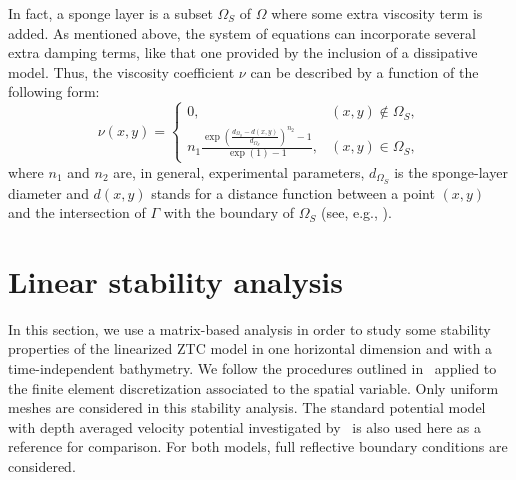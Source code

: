 In fact, a sponge layer is a subset $\Omega_S$ of $\Omega$ where some
extra viscosity term is added.  As mentioned above, the system of
equations can incorporate several extra damping terms, like that one
provided by the inclusion of a dissipative model. Thus, the viscosity
coefficient $\nu$ can be described by a function of the following
form:
\begin{equation}
\label{eq:lopes:sponge}
\nu(x,y)= \left\{
  \begin{matrix}
    0,& (x,y)\not\in\Omega_S ,\\ \displaystyle
    n_1\frac{\displaystyle\exp{\left(\frac{d_{\Omega_S}-d(x,y)}
          {d_{\Omega_S}}\right)^{n_2}}-1}{\exp(1)-1},& (x,y)
    \in\Omega_S,
  \end{matrix}
\right.
\end{equation}
where $n_1$ and $n_2$ are, in general, experimental parameters,
$d_{\Omega_S}$ is the sponge-layer diameter and $d(x,y)$ stands for a
distance function between a point $(x,y)$ and the intersection of
$\Gamma$ with the boundary of $\Omega_S$ (see,
e.g., \citet{Walkley1999}).

\section{Linear stability analysis}
\label{sec:lopes:linearanalysis}

In this section, we use a matrix-based analysis in order to study some
stability properties of the linearized ZTC model in one horizontal
dimension and with a time-independent bathymetry. We follow the
procedures outlined in~\citet{LovholtPedersen2009} applied to the
finite element discretization associated to the spatial variable.
Only uniform meshes are considered in this stability analysis.  The
standard potential model with depth averaged velocity potential
investigated by~\citet{LovholtPedersen2009} is also used here as a
reference for comparison.  For both models, full reflective boundary
conditions are considered.

